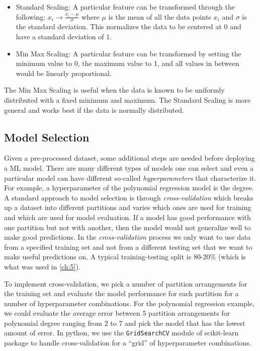 \begin{itemize}
	\item Standard Scaling: A particular feature can be transformed through the following: $x_i \rightarrow \frac{x_i - \mu}{\sigma}$ where $\mu$ is the mean of all the data points $x_i$ and $\sigma$ is the standard deviation. This normalizes the data to be centered at 0 and have a standard deviation of 1. 
	\item Min Max Scaling: A particular feature can be transformed by setting the minimum value to 0, the maximum value to 1, and all values in between would be linearly proportional. 
\end{itemize}
The Min Max Scaling is useful when the data is known to be uniformly distributed with a fixed minimum and maximum. The Standard Scaling is more general and works best if the data is normally distributed. 

\subsection{Model Selection}
Given a pre-processed dataset, some additional steps are needed before deploying a \gls{ML} model. There are many different types of models one can select and even a particular model can have different so-called \emph{hyperparameters} that characterize it. For example, a hyperparameter of the polynomial regression model is the degree. A standard approach to model selection is through \emph{cross-validation} which breaks up a dataset into different partitions and varies which ones are used for training and which are used for model evaluation. If a model has good performance with one partition but not with another, then the model would not generalize well to make good predictions. In the \emph{cross-validation} process we only want to use data from a specified training set and not from a different testing set that we want to make useful predictions on. A typical training-testing split is 80-20\% (which is what was used in \autoref{ch:5}). 

To implement cross-validation, we pick a number of partition arrangements for the training set and evaluate the model performance for each partition for a number of hyperparameter combinations. For the polynomial regression example, we could evaluate the average error between 5 partition arrangements for polynomial degree ranging from 2 to 7 and pick the model that has the lowest amount of error. In python, we use the \texttt{GridSearchCV} module of scikit-learn \cite{Pedregosa_2011_Scikit-Learn} package to handle cross-validation for a ``grid'' of hyperparameter combinations.

